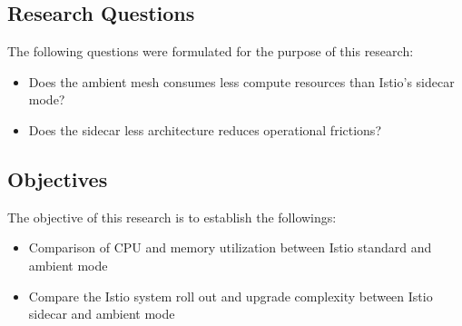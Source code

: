 \subsection{Research Questions}
The following questions were formulated for the purpose of this research:
\begin{itemize}
\item Does the ambient mesh consumes less compute resources than Istio's sidecar mode?
\item Does the sidecar less architecture reduces operational frictions?
\end{itemize}

\subsection{Objectives}
The objective of this research is to establish the followings:
\begin{itemize}
\item Comparison of CPU and memory utilization between Istio standard and ambient mode
\item Compare the Istio system roll out and upgrade complexity between Istio sidecar and ambient mode
\end{itemize}